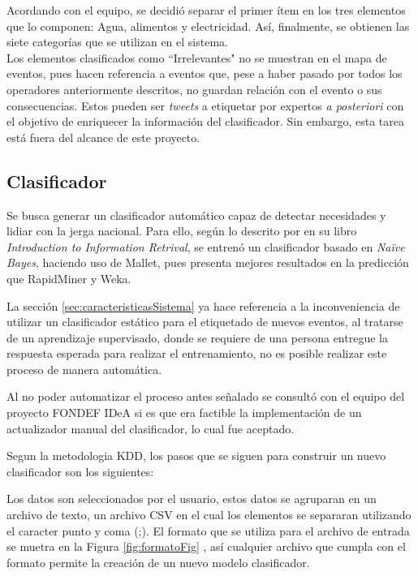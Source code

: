 Acordando con el equipo, se decidió separar el primer ítem en los tres elementos que lo componen: Agua, alimentos y electricidad. Así, finalmente, se obtienen las siete categorías que se utilizan en el sistema.\\

Los elementos clasificados como ``Irrelevantes" no se muestran en el mapa de eventos, pues hacen referencia a eventos que, pese a haber pasado por todos los operadores anteriormente descritos, no guardan relación con el evento o sus consecuencias. Estos pueden ser \textit{tweets} a etiquetar por expertos \textit{a posteriori} con el objetivo de enriquecer la información del clasificador. Sin embargo, esta tarea está fuera del alcance de este proyecto.

\subsection{Clasificador}
\label{sec:diseno:clasificador}

Se busca generar un clasificador automático capaz de detectar necesidades y lidiar con la jerga nacional. Para ello, según lo descrito por \cite{IRQE} en su libro \textit{Introduction to Information Retrival}, se entrenó un clasificador basado en \textit{Naïve Bayes}, haciendo uso de Mallet, pues presenta mejores resultados en la predicción que RapidMiner y Weka.

La sección \ref{sec:caracteristicasSistema} ya hace referencia a la inconveniencia de utilizar un clasificador estático para el etiquetado de nuevos eventos, al tratarse de un aprendizaje supervisado, donde se requiere de una persona entregue la respuesta esperada para realizar el entrenamiento, no es posible realizar este proceso de manera automática.

Al no poder automatizar el proceso antes señalado se consultó con el equipo del proyecto FONDEF IDeA si es que era factible la implementación de un actualizador manual del clasificador, lo cual fue aceptado.

Segun la metodologia KDD, los pasos que se siguen para construir un nuevo clasificador son los siguientes:

Los datos son seleccionados por el usuario, estos datos se agruparan en un archivo de texto, un archivo CSV en el cual los elementos se separaran utilizando el caracter punto y coma (;). El formato que se utiliza para el archivo de entrada se muetra en la Figura \ref{fig:formatoFig} , así cualquier archivo que cumpla con el formato permite la creación de un nuevo modelo clasificador.

